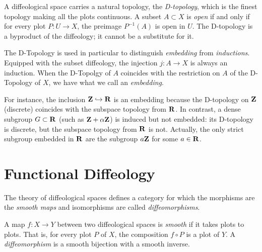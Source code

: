 \documentclass[10pt,reqno,letterpaper,twoside]{amsbook}
\begin{document}
  \begin{article}
    A diffeological space carries a natural topology,
    the \emph{D-topology},
    which is the finest topology making all the plots continuous.
    A subset $A \subset X$ is \emph{open} if and only if for every plot $P: U \to X$,
    the preimage $P^{-1}(A)$ is open in $U$.
    The D-topology is a byproduct of the diffeology;
    it cannot be a substitute for it.
    
    The D-Topology is used in particular to distinguish \emph{embedding} from \emph{inductions}.
    Equipped with the subset diffeology,
    the injection $j: A \to X$ is always an induction.
    When the D-Topolgy of $A$ coincides with the restriction on $A$ of the D-Topology of $X$,
    we have what we call an \emph{embedding}.
    
    For instance, the inclusion ${\mathbf{Z}} \hookrightarrow {\mathbf{R}}$ is an embedding because
    the D-topology on ${\mathbf{Z}}$ (discrete) coincides with the subspace topology from ${\mathbf{R}}$.
    In contrast, a dense subgroup $G \subset {\mathbf{R}}$ (such as ${\mathbf{Z}} + \alpha{\mathbf{Z}}$) is
    induced but not embedded: its D-topology is discrete, but the subspace topology
    from ${\mathbf{R}}$ is not.
    Actually,
    the only strict subgroup embedded in ${\mathbf{R}}$ are the subgroup $a{\mathbf{Z}}$ for some $a \in {\mathbf{R}}$.
  \end{article}
  
  \section{Functional Diffeology}
  \label{sec:Functional Diffeology}
  
  The theory of diffeological spaces defines a category for which the morphisms are the \emph{smooth maps} and isomorphisms are called \emph{diffeomorphisms}.
  
  \begin{article}
    A map $f: X \to Y$ between two diffeological spaces is \emph{smooth} if it takes plots to plots.
    That is,
    for every plot $P$ of $X$,
    the composition $f \circ P$ is a plot of $Y$.
    A \emph{diffeomorphism} is a smooth bijection with a smooth inverse.
  \end{article}
  
\end{document}
